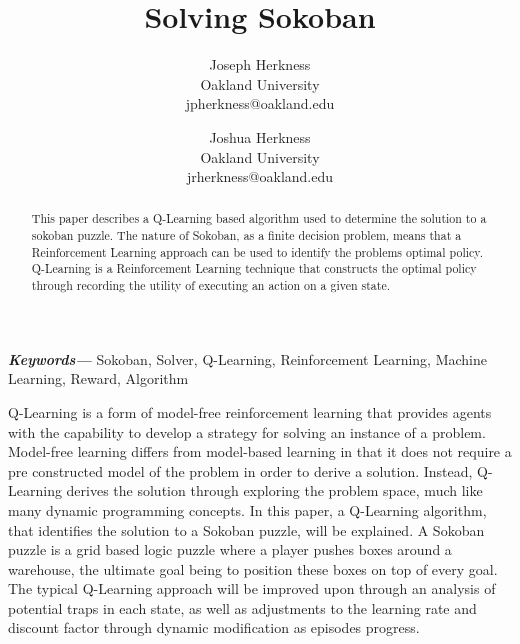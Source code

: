 \documentclass[times, 10pt,twocolumn]{article}
\begin{document}
\title{Solving Sokoban}

\author{
Joseph Herkness\\
Oakland University\\
jpherkness@oakland.edu\\
\and
Joshua Herkness\\
Oakland University\\
jrherkness@oakland.edu\\
}

\maketitle
\thispagestyle{empty}

\begin{abstract}
   This paper describes a Q-Learning based algorithm used to determine the solution to a sokoban puzzle. The nature of Sokoban, as a finite decision problem, means that a Reinforcement Learning approach can be used to identify the problems optimal policy. Q-Learning is a Reinforcement Learning technique that constructs the optimal policy through recording the utility of executing an action on a given state. 
\end{abstract}

\providecommand{\keywords}[1]{\textbf{\textit{Keywords---}} #1}
\keywords{Sokoban, Solver, Q-Learning, Reinforcement Learning, Machine Learning, Reward, Algorithm}


Q-Learning is a form of model-free reinforcement learning that provides agents with the capability to develop a strategy for solving an instance of a problem. Model-free learning differs from model-based learning in that it does not require a pre constructed model of the problem in order to derive a solution. Instead, Q-Learning derives the solution through exploring the problem space, much like many dynamic programming concepts. In this paper, a Q-Learning algorithm, that identifies the solution to a Sokoban puzzle, will be explained. A Sokoban puzzle is a grid based logic puzzle where a player pushes boxes around a warehouse, the ultimate goal being to position these boxes on top of every goal. The typical Q-Learning approach will be improved upon through an analysis of potential traps in each state, as well as adjustments to the learning rate and discount factor through dynamic modification as episodes progress. 
\end{document}
